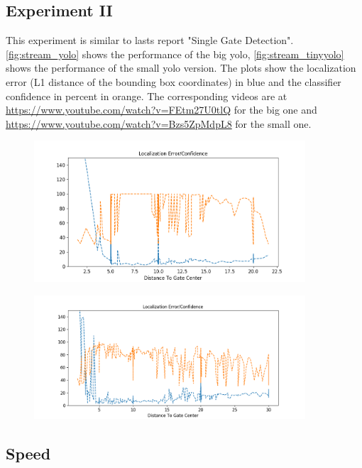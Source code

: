 \documentclass{article}
\begin{document}
\subsection{Experiment II}

This experiment is similar to lasts report "Single Gate Detection". \autoref{fig:stream_yolo} shows the performance of the big yolo, \autoref{fig:stream_tinyyolo} shows the performance of the small yolo version. The plots show the localization error (L1 distance of the bounding box coordinates) in blue and the classifier confidence in percent in orange. The corresponding videos are at \url{https://www.youtube.com/watch?v=FEtm27U0tlQ} for the big one and \url{https://www.youtube.com/watch?v=Bzs5ZpMdpL8} for the small one.
\begin{figure}[hbtp]
	\centering
	\includegraphics[width=0.9\textwidth]{fig/stream3_yolo}
	\label{fig:stream_yolo}
\end{figure}

\begin{figure}[hbtp]
	\centering
	\includegraphics[width=0.9\textwidth]{fig/stream3_tinyyolo}
	\label{fig:stream_tinyyolo}
\end{figure}

\subsection{Speed}
\end{document}

